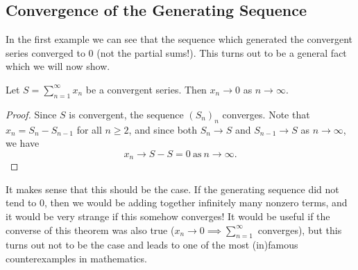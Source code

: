 \documentclass[../real_analysis.tex]{subfiles}
\begin{document}
        \subsection{Convergence of the Generating Sequence}\label{subsec:convergence-of-the-generating-sequence}
            In the first example we can see that the sequence which generated the convergent series converged to 0 (not the partial sums!). This turns out to be a general fact which we will now show.
            \begin{theorem}\label{thm:seq-of-series-to-0}
                Let $S=\sum_{n=1}^\infty x_n$ be a convergent series. Then $x_n\to0$ as $n\to\infty$.
            \end{theorem}
            \begin{proof}
                Since $S$ is convergent, the sequence $(S_n)_n$ converges. Note that $x_n=S_n-S_{n-1}$ for all $n\geq2$, and since both $S_n\to S$ and $S_{n-1}\to S$ as $n\to\infty$, we have
                \begin{equation}
                    x_n\to S-S=0\ \text{as}\ n\to\infty.
                \end{equation}
            \end{proof}
            It makes sense that this should be the case. If the generating sequence did not tend to 0, then we would be adding together infinitely many nonzero terms, and it would be very strange if this somehow converges! It would be useful if the converse of this theorem was also true ($x_n\to0\implies\sum_{n=1}^\infty$ converges), but this turns out not to be the case and leads to one of the most (in)famous counterexamples in mathematics.
\end{document}
